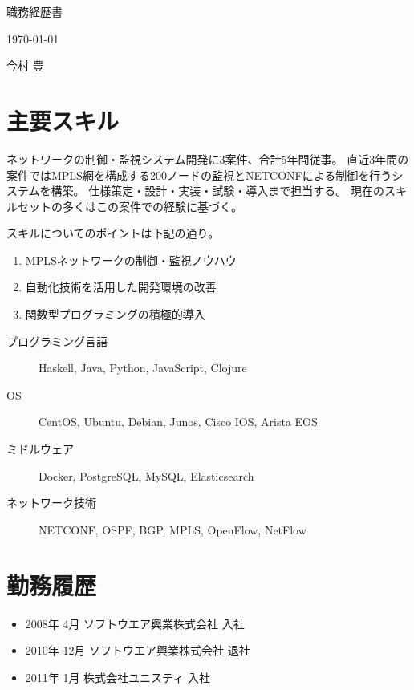 \documentclass[9pt]{jsarticle}
\begin{document}
\begin{center}
  {\Large 職務経歴書}
\end{center}

\begin{flushleft}
  \today
\end{flushleft}

\begin{flushright}
  今村 豊
\end{flushright}

\section{主要スキル}

ネットワークの制御・監視システム開発に3案件、合計5年間従事。
直近3年間の案件ではMPLS網を構成する200ノードの監視とNETCONFによる制御を行うシステムを構築。
仕様策定・設計・実装・試験・導入まで担当する。
現在のスキルセットの多くはこの案件での経験に基づく。

スキルについてのポイントは下記の通り。

\begin{enumerate}
  \item MPLSネットワークの制御・監視ノウハウ
  \item 自動化技術を活用した開発環境の改善
  \item 関数型プログラミングの積極的導入
\end{enumerate}

\begin{description}
    \item[プログラミング言語] Haskell, Java, Python, JavaScript, Clojure
    \item[OS] CentOS, Ubuntu, Debian, Junos, Cisco IOS, Arista EOS
    \item[ミドルウェア] Docker, PostgreSQL, MySQL, Elasticsearch
    \item[ネットワーク技術] NETCONF, OSPF, BGP, MPLS, OpenFlow, NetFlow
\end{description}

\section{勤務履歴}

\begin{itemize}
  \item 2008年  4月 ソフトウエア興業株式会社 入社
  \item 2010年 12月 ソフトウエア興業株式会社 退社
  \item 2011年  1月 株式会社ユニスティ 入社　
\end{itemize}
\end{document}
